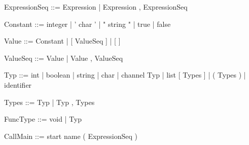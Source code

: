 \documentclass[11pt]{report}
\begin{document}
\begin{verbnobox}[\normalfont]
ExpressionSeq ::= Expression | Expression , ExpressionSeq
\end{verbnobox}
\vspace*{3pt}

\begin{verbnobox}[\normalfont]
Constant ::= integer
             | ' char '
             | " string "
             | true
             | false
\end{verbnobox}
\vspace*{3pt}

\begin{verbnobox}[\normalfont]
Value ::= Constant | [ ValueSeq ] | [ ]
\end{verbnobox}
\vspace*{3pt}

\begin{verbnobox}[\normalfont]
ValueSeq ::= Value | Value , ValueSeq
\end{verbnobox}
\vspace*{3pt}

\begin{verbnobox}[\normalfont]
Typ ::= int
      | boolean
      | string
      | char
      | channel Typ
      | list [ Types ]
      | ( Types )
      | identifier
\end{verbnobox}
\vspace*{3pt}

\begin{verbnobox}[\normalfont]
Types ::= Typ | Typ , Types
\end{verbnobox}
\vspace*{3pt}

\begin{verbnobox}[\normalfont]
FuncType ::= void | Typ
\end{verbnobox}
\vspace*{3pt}

\begin{verbnobox}[\normalfont]
CallMain ::= start name ( ExpressionSeq )
\end{verbnobox}
\vspace*{3pt}

\newpage
{}
{}
\vspace*{3pt}
\vspace*{10pt}
\end{document}
